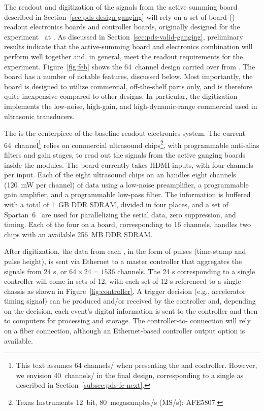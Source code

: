 The readout and digitization of the signals from the active summing board described in Section~\ref{sec:pds-design-ganging} will rely on a set of  board () readout electronics boards and controller boards, originally designed for the  experiment~\cite{bib:mu2e_tdr}
at . As discussed in Section~\ref{sec:pds-valid-ganging}, preliminary results indicate that the active-summing board and  electronics  combination will perform well together and, in general, meet the readout requirements for the experiment. Figure~\ref{fig:feb} shows the 64~channel  design carried over from . The board has a number of notable features, discussed below. Most importantly,  
the board is designed to utilize commercial, off-the-shelf parts only, and is therefore quite inexpensive compared to other designs. In particular, the digitization implements the low-noise, high-gain, and high-dynamic-range commercial  used in ultrasonic transducers. 

The  is the centerpiece of the baseline readout electronics system.  
The current 64~channel\footnote{This text assumes 64 channels/ when presenting the  and controller. However, we envision 40~channels/ in the final design, corresponding to a single  as described in Section~\ref{subsec:pds-fe-next}.}  relies on commercial ultrasound chips\footnote{Texas Instruments\texttrademark{} 12~bit, 80~megasamples/s (MS/s); AFE5807.},
with programmable anti-alias filters and gain stages, to read out the  signals from the active ganging boards inside the  modules. The board currently takes HDMI inputs, with four channels per input.  Each of the eight ultrasound chips on an  handles eight channels (\SI{120}{mW} per channel) of data using a low-noise preamplifier, a programmable gain amplifier, and a programmable low-pass filter. The information is buffered with a total of \SI{1}{GB} DDR SDRAM, divided in four places, and a set of Spartan~6\texttrademark~ are used for parallelizing the serial  data, zero suppression, and timing. Each of the four  on a board, corresponding to 16 channels, handles two  chips with an available \SI{256}{MB} DDR SDRAM. 

After digitization, the data from each , in the form of pulses (time-stamp and pulse height), is sent via Ethernet to a master controller that aggregates the signals from 24 s, or $64\times24=1536$ channels. The 24 s corresponding to a single controller will come in sets of 12, with each set of 12 s referenced to a single chassis as shown in %
Figure~\ref{fig:controller}. A trigger decision (e.g., accelerator timing signal) can be produced and/or received by the controller and, depending on the decision, each event's digital information is sent to the controller and then to  computers for processing and storage. The controller-to- connection will rely on a fiber connection, although an Ethernet-based controller output option is available.


